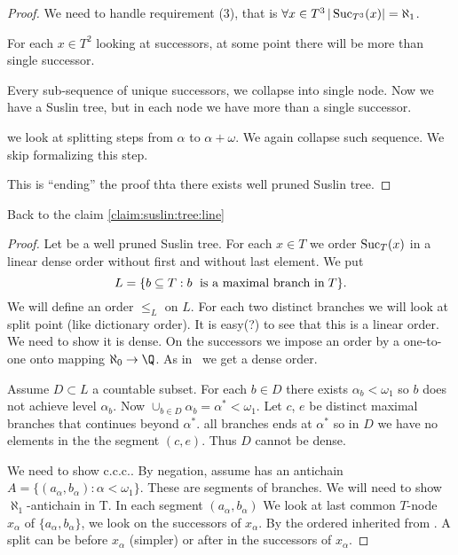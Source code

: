 \documentclass[11pt,pdftex,twoside,a4paper]{article}
\newcommand{\ccc}{c.c.c.}
\newcommand{\Suc}{\ensuremath{\mathop{\rm Suc}\nolimits}}
\theoremstyle{definition}
\begin{document}
{\begin{proof}
We need to handle requirement (3), 
that is \(\forall x\in T^3\,|\Suc_{T^3}(x)|=\aleph_1\).

For each \(x\in T^2\) looking at successors, at some point
there will be more than single successor.

Every sub-sequence of unique successors, we collapse into single node.
Now we have a Suslin tree, but in each node we have more than a single successor.

we look at splitting steps from \(\alpha\) to \(\alpha+\omega\).
We again collapse such sequence.
We skip formalizing this step.

This is ``ending'' the proof thta there exists well pruned Suslin tree.
\end{proof}

Back to the claim \ref{claim:suslin:tree:line}
\begin{proof}
Let  be a well pruned Suslin tree.
For each \(x\in T\) we order \(\Suc_T(x)\) in a linear dense order
without first and without last element.
We put
\begin{equation*}
L = \{b \subseteq T: b\; \textnormal{ is a maximal branch in}\; T\}.
\end{equation*}
We will define an order \(\leq_L\) on $L$.
For each two distinct branches we will look at split point
(like dictionary order).
It is easy(?) to see that this is a linear order.
We need to show it is dense.
On the successors we impose an order by a one-to-one onto mapping
\(\aleph_0\to\Q\). As in \Q\ we get a dense order.

Assume \(D\subset L\) a countable subset.
For each \(b\in D\) there exists \(\alpha_b < \omega_1\)
so $b$ does not achieve level \(\alpha_b\).
Now \(\cup_{b\in D} \alpha_b = \alpha^* < \omega_1\).
Let $c$, $e$ be distinct maximal branches that continues beyond \(\alpha^*\).
all branches ends at \(\alpha^*\) so in $D$ we have no elements in the
the segment \((c,e)\). Thus $D$ cannot be dense.

We need to show \ccc.
By negation, assume  has
an antichain \(A=\{(a_\alpha,b_\alpha): \alpha < \omega_1\}\).
These are segments of branches.
We will need to show \(\aleph_1\)-antichain in T.
In each segment \((a_\alpha,b_\alpha)\)
We look at last common $T$-node \(x_\alpha\) of \(\{a_\alpha,b_\alpha\}\),
we look on the successors of \(x_\alpha\). By the ordered inherited from \Q.
A split can be before \(x_\alpha\) (simpler)
or after in the successors of \(x_\alpha\).


\end{proof}}
\end{document}
